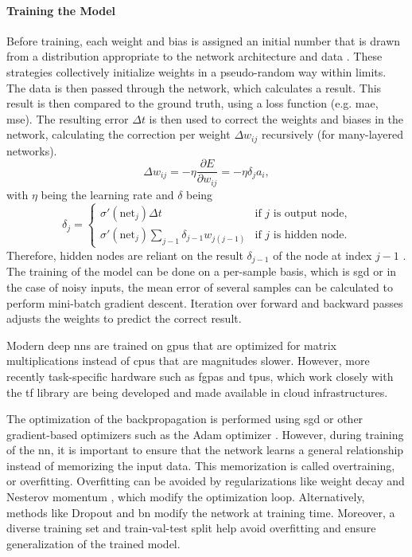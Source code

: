 \paragraph{Training the Model} 
Before training, each weight and bias is assigned an initial number that is drawn from a distribution appropriate to the network architecture and data \citep{lecun2012efficient, glorot2010understanding, he2015delving}. These strategies collectively initialize weights in a pseudo-random way within limits. The data is then passed through the network, which calculates a result. This result is then compared to the ground truth, using a loss function (e.g. \ac{mae}, \ac{mse}). The resulting error $\Delta t$ is then used to correct the weights and biases in the network, calculating the correction per weight $\Delta w_{ij}$ recursively (for many-layered networks).
\begin{equation}
    \Delta w_{ij}= -\eta \dfrac{\partial E}{\partial w_{ij}} = -\eta \delta_{j} a_{i},
\end{equation}
with $\eta$ being the learning rate and $\delta$ being
\begin{equation}
    \delta_{j}=\begin{cases}
\sigma'( \text{net}_{j} ) \Delta t              & \text{if } j \text{ is output node,}\\
\sigma'( \text{net}_{j} ) \sum_{j-1} \delta_{j-1} w_{j(j-1)} & \text{if } j \text{ is hidden node.}
\end{cases}
\end{equation}
Therefore, hidden nodes are reliant on the result $\delta_{j-1}$ of the node at index $j-1$ \citep{deeplearningbook}. The training of the model can be done on a per-sample basis, which is \ac{sgd} or in the case of noisy inputs, the mean error of several samples can be calculated to perform mini-batch gradient descent. Iteration over forward and backward passes adjusts the weights to predict the correct result. 

Modern deep \acp{nn} are trained on \acp{gpu} that are optimized for matrix multiplications instead of \acp{cpu} that are magnitudes slower. However, more recently task-specific hardware such as \acp{fgpa} and \acp{tpu}, which work closely with the \ac{tf} library are being developed and made available in cloud infrastructures.

The optimization of the backpropagation is performed using \ac{sgd} or other gradient-based optimizers such as the Adam optimizer \citep{kingma2014adam}. However, during training of the \ac{nn}, it is important to ensure that the network learns a general relationship instead of memorizing the input data. This memorization is called overtraining, or overfitting. Overfitting can be avoided by regularizations like weight decay \citep{krogh1992simple} and Nesterov momentum \citep{pmlr-v28-sutskever13}, which modify the optimization loop. Alternatively, methods like Dropout \citep{hinton2012improving} and \ac{bn} \citep{ioffe2015batch} modify the network at training time. Moreover, a diverse training set and train-val-test split help avoid overfitting and ensure generalization of the trained model.

